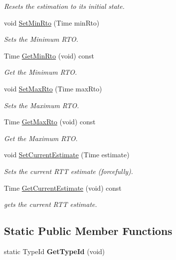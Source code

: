 \begin{DoxyCompactItemize}
\begin{DoxyCompactList}\small\item\em Resets the estimation to its initial state. \end{DoxyCompactList}\item 
void \hyperlink{classns3_1_1ndn_1_1RttEstimator_ac7f64ba82356a18e0aa07ca441b4c669}{Set\+Min\+Rto} (Time min\+Rto)
\begin{DoxyCompactList}\small\item\em Sets the Minimum R\+TO. \end{DoxyCompactList}\item 
Time \hyperlink{classns3_1_1ndn_1_1RttEstimator_a304c2f277057dd594175997cc4043efc}{Get\+Min\+Rto} (void) const
\begin{DoxyCompactList}\small\item\em Get the Minimum R\+TO. \end{DoxyCompactList}\item 
void \hyperlink{classns3_1_1ndn_1_1RttEstimator_a8fc1f1d24921e2cfc842317a775a3c08}{Set\+Max\+Rto} (Time max\+Rto)
\begin{DoxyCompactList}\small\item\em Sets the Maximum R\+TO. \end{DoxyCompactList}\item 
Time \hyperlink{classns3_1_1ndn_1_1RttEstimator_adbe162ca33ea296fd52f34b05bd02794}{Get\+Max\+Rto} (void) const
\begin{DoxyCompactList}\small\item\em Get the Maximum R\+TO. \end{DoxyCompactList}\item 
void \hyperlink{classns3_1_1ndn_1_1RttEstimator_a408f1fcd62c5350e414ed03d0b0a705c}{Set\+Current\+Estimate} (Time estimate)
\begin{DoxyCompactList}\small\item\em Sets the current R\+TT estimate (forcefully). \end{DoxyCompactList}\item 
Time \hyperlink{classns3_1_1ndn_1_1RttEstimator_ade22674457f67c746380929030d8f90c}{Get\+Current\+Estimate} (void) const
\begin{DoxyCompactList}\small\item\em gets the current R\+TT estimate. \end{DoxyCompactList}\end{DoxyCompactItemize}
\subsection*{Static Public Member Functions}
\begin{DoxyCompactItemize}
\item 
static Type\+Id {\bfseries Get\+Type\+Id} (void)\hypertarget{classns3_1_1ndn_1_1RttEstimator_a2d92740c64eb929214b95bc9104b5c35}{}\label{classns3_1_1ndn_1_1RttEstimator_a2d92740c64eb929214b95bc9104b5c35}

\end{DoxyCompactItemize}
